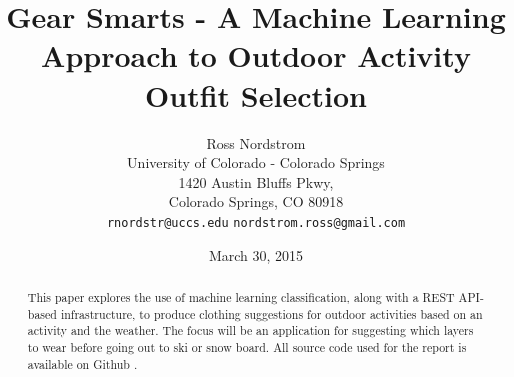 \documentclass{sig-alternate}
\begin{document}
\title{Gear Smarts - A Machine Learning Approach to Outdoor Activity Outfit Selection}
\author{Ross Nordstrom\\
        University of Colorado - Colorado Springs\\
        1420 Austin Bluffs Pkwy,\\
        Colorado Springs, CO 80918\\
        \texttt{rnordstr@uccs.edu}
        \texttt{nordstrom.ross@gmail.com}
       }
\date{March 30, 2015}

\maketitle

\begin{abstract}
This paper explores the use of machine learning classification, along with a REST API-based infrastructure, to
produce clothing suggestions for outdoor activities based on an activity and the weather. The focus will be an
application for suggesting which layers to wear before going out to ski or snow board. All source code used for the
report is available on Github \cite{repo}.
\end{abstract}






%




{}



\end{document}
